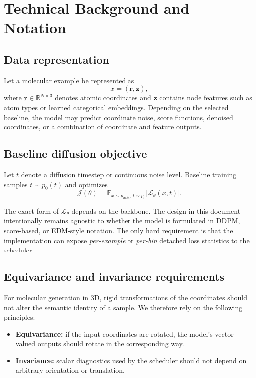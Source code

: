 \documentclass[11pt]{report}
\newcommand{\E}{\mathbb{E}}
\newcommand{\R}{\mathbb{R}}
\newcommand{\pbase}{p_0}
\newcommand{\loss}{\mathcal{L}}
\newcommand{\obj}{\mathcal{J}}
\begin{document}
\chapter{Technical Background and Notation}

\section{Data representation}

Let a molecular example be represented as
\[
x = (\mathbf{r}, \mathbf{z}),
\]
where $\mathbf{r} \in \R^{N \times 3}$ denotes atomic coordinates and $\mathbf{z}$ contains node features such as atom types or learned categorical embeddings. Depending on the selected baseline, the model may predict coordinate noise, score functions, denoised coordinates, or a combination of coordinate and feature outputs.

\section{Baseline diffusion objective}

Let $t$ denote a diffusion timestep or continuous noise level. Baseline training samples $t \sim \pbase(t)$ and optimizes
\[
\obj(\theta) = \E_{x \sim p_{\text{data}},\, t \sim \pbase}\big[\loss_\theta(x, t)\big].
\]

The exact form of $\loss_\theta$ depends on the backbone. The design in this document intentionally remains agnostic to whether the model is formulated in DDPM, score-based, or EDM-style notation. The only hard requirement is that the implementation can expose \emph{per-example} or \emph{per-bin} detached loss statistics to the scheduler.

\section{Equivariance and invariance requirements}

For molecular generation in 3D, rigid transformations of the coordinates should not alter the semantic identity of a sample. We therefore rely on the following principles:

\begin{itemize}[leftmargin=2em]
    \item \textbf{Equivariance:} if the input coordinates are rotated, the model's vector-valued outputs should rotate in the corresponding way.
    \item \textbf{Invariance:} scalar diagnostics used by the scheduler should not depend on arbitrary orientation or translation.
\end{itemize}
\end{document}
